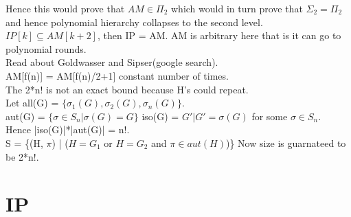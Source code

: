 \documentclass[solution,addpoints,12pt]{exam}
\begin{document}
Hence this would prove that $AM \in \Pi_2$ which would in turn
prove that $\Sigma_2 = \Pi_2$ and hence polynomial hierarchy
collapses to the second level.\\
$IP[k] \subseteq AM[k+2]$, then IP = AM. AM is arbitrary here
that is it can go to polynomial rounds.\\
Read about Goldwasser and Sipser(google search).\\
AM[f(n)] = AM[f(n)/2+1] constant number of times.\\
The 2*n! is not an exact bound because H's could repeat.\\
Let all(G) = $\{\sigma_1(G), \sigma_2(G), \sigma_n(G)\}$.\\
aut(G) = $\{\sigma \in S_n | \sigma(G) = G\}$
iso(G) = $G'| G' = \sigma(G)$ for some $\sigma \in S_n$.\\
Hence |iso(G)|*|aut(G)| = n!.\\
S = \{(H, $\pi$) | ($H = G_1$ or $H = G_2$ and $\pi \in aut(H)$)\}
Now size is guarnateed to be 2*n!.\\

\section{IP}
\end{document}
